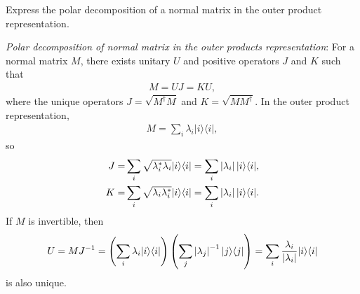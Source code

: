 \documentclass[en]{sol-man}
\begin{document}
\begin{exe}
    Express the polar decomposition of a normal matrix in the outer product representation.
\end{exe}
\begin{sol}
    \emph{Polar decomposition of normal matrix in the outer products representation}: For a normal matrix $M$, there exists unitary $U$ and positive operators $J$ and $K$ such that
    \begin{align}
        M=UJ=KU,
    \end{align}
    where the unique operators $J=\sqrt{M^{\dagger}M}$ and $K=\sqrt{MM^{\dagger}}$. In the outer product representation,
    \begin{align}
        M=\sum_i\lambda_i\lvert i\rangle\langle i\rvert,
    \end{align}
    so
    \begin{align}
        J=&\sum_i\sqrt{\lambda_i^*\lambda_i}\lvert i\rangle\langle i\rvert=\sum_i\left\lvert\lambda_i\right\rvert\lvert i\rangle\langle i\rvert,\\
        K=&\sum_i\sqrt{\lambda_i\lambda_i^*}\lvert i\rangle\langle i\rvert=\sum_i\left\lvert\lambda_i\right\rvert\lvert i\rangle\langle i\rvert.
    \end{align}
    If $M$ is invertible, then
    \begin{align}
        U=MJ^{-1}=\left(\sum_i\lambda_i\lvert i\rangle\langle i\rvert\right)\left(\sum_j\left\lvert\lambda_j\right\rvert^{-1}\lvert j\rangle\langle j\rvert\right)=\sum_i\frac{\lambda_i}{\left\lvert\lambda_i\right\rvert}\lvert i\rangle\langle i\rvert
    \end{align}
    is also unique.
\end{sol}
\end{document}
